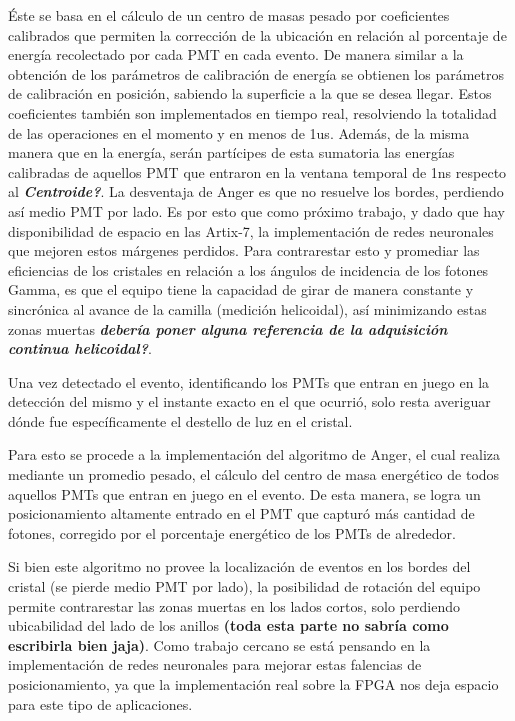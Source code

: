 \documentclass[conference]{IEEEtran}
\begin{document}
Éste se basa en el cálculo de un centro de masas pesado por coeficientes calibrados que permiten la corrección de la ubicación en relación al porcentaje de energía recolectado por cada PMT en cada evento. 
De manera similar a la obtención de los parámetros de calibración de energía se obtienen los parámetros de calibración en posición, sabiendo la superficie a la que se desea llegar. Estos coeficientes también son implementados en tiempo real, resolviendo la totalidad de las operaciones en el momento y en menos de 1us. Además, de la misma manera que en la energía, serán partícipes de esta sumatoria las energías calibradas de aquellos PMT que entraron en la ventana temporal de 1ns respecto al \textit{\textbf{Centroide?}}.
La desventaja de Anger es que no resuelve los bordes, perdiendo así medio PMT por lado. Es por esto que como próximo trabajo, y dado que hay disponibilidad de espacio en las Artix-7, la implementación de redes neuronales que mejoren estos márgenes perdidos. Para contrarestar esto y promediar las eficiencias de los cristales en relación a los ángulos de incidencia de los fotones Gamma, es que el equipo tiene la capacidad de girar de manera constante y sincrónica al avance de la camilla (medición helicoidal), así minimizando estas zonas muertas \textit{\textbf{debería poner alguna referencia de la adquisición continua helicoidal?}}.



Una vez detectado el evento, identificando los PMTs que entran en juego en la detección del mismo y el instante exacto en el que ocurrió, solo resta averiguar dónde fue específicamente el destello de luz en el cristal.

Para esto se procede a la implementación del algoritmo de Anger, el cual realiza mediante un promedio pesado, el cálculo del centro de masa energético de todos aquellos PMTs que entran en juego en el evento. De esta manera, se logra un posicionamiento altamente entrado en el PMT que capturó más cantidad de fotones, corregido por el porcentaje energético de los PMTs de alrededor.

Si bien este algoritmo no provee la localización de eventos en los bordes del cristal (se pierde medio PMT por lado), la posibilidad de rotación del equipo permite contrarestar las zonas muertas en los lados cortos, solo perdiendo ubicabilidad del lado de los anillos \textbf{(toda esta parte no sabría como escribirla bien jaja)}. Como trabajo cercano se está pensando en la implementación de redes neuronales para mejorar estas falencias de posicionamiento, ya que la implementación real sobre la FPGA nos deja espacio para este tipo de aplicaciones.
\end{document}

